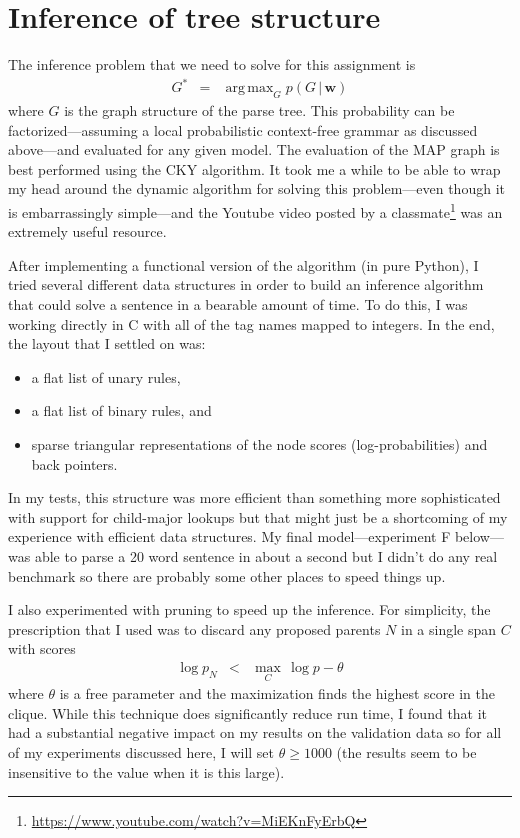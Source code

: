 \documentclass[11pt]{article}
\newcommand{\bvec}[1]{\ensuremath{\boldsymbol{#1}}}
\DeclareMathOperator*{\argmax}{arg\,max}
\begin{document}
\section{Inference of tree structure}

The inference problem that we need to solve for this assignment is
\begin{eqnarray}
    G^* &=& \argmax_{G} p (G\,|\,\bvec{w})
\end{eqnarray}
where $G$ is the graph structure of the parse tree.
This probability can be factorized---assuming a local probabilistic
context-free grammar as discussed above---and evaluated for any given model.
The evaluation of the MAP graph is best performed using the CKY algorithm.
It took me a while to be able to wrap my head around the dynamic algorithm for
solving this problem---even though it is embarrassingly simple---and the
Youtube video posted by a
classmate\footnote{\url{https://www.youtube.com/watch?v=MiEKnFyErbQ}} was an
extremely useful resource.

After implementing a functional version of the algorithm (in pure Python), I
tried several different data structures in order to build an inference
algorithm that could solve a sentence in a bearable amount of time.
To do this, I was working directly in C with all of the tag names mapped to
integers.
In the end, the layout that I settled on was:
\begin{itemize}
\item{a flat list of unary rules,}
\item{a flat list of binary rules, and}
\item{sparse triangular representations of the node scores
      (log-probabilities) and back pointers.}
\end{itemize}
In my tests, this structure was more efficient than something more
sophisticated with support for child-major lookups but that might just be a
shortcoming of my experience with efficient data structures.
My final model---experiment F below---was able to parse a 20 word sentence in
about a second but I didn't do any real benchmark so there are probably some
other places to speed things up.

I also experimented with pruning to speed up the inference.
For simplicity, the prescription that I used was to discard any proposed
parents $N$ in a single span $C$ with scores
\begin{eqnarray}
    \log p_N &<& \max_C\,\log p - \theta
\end{eqnarray}
where $\theta$ is a free parameter and the maximization finds the highest
score in the clique.
While this technique does significantly reduce run time, I found that it had a
substantial negative impact on my results on the validation data so for all of
my experiments discussed here, I will set $\theta \ge 1000$ (the results seem
to be insensitive to the value when it is this large).
\end{document}
